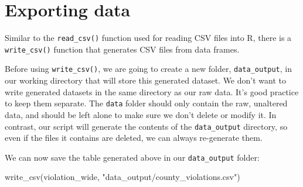 \documentclass[
]{book}
\newenvironment{Shaded}{\begin{snugshade}}{\end{snugshade}}
\newcommand{\FunctionTok}[1]{\textcolor[rgb]{0.00,0.00,0.00}{#1}}
\newcommand{\NormalTok}[1]{#1}
\newcommand{\StringTok}[1]{\textcolor[rgb]{0.31,0.60,0.02}{#1}}
\begin{document}
\hypertarget{exporting-data}{%
\section{Exporting data}\label{exporting-data}}

Similar to the \texttt{read\_csv()} function used for reading CSV files into R, there is a \texttt{write\_csv()} function that generates CSV files from data frames.

Before using \texttt{write\_csv()}, we are going to create a new folder, \texttt{data\_output},
in our working directory that will store this generated dataset. We don't want
to write generated datasets in the same directory as our raw data. It's good
practice to keep them separate. The \texttt{data} folder should only contain the raw,
unaltered data, and should be left alone to make sure we don't delete or modify
it. In contrast, our script will generate the contents of the \texttt{data\_output}
directory, so even if the files it contains are deleted, we can always
re-generate them.

We can now save the table generated above in our \texttt{data\_output}
folder:

\begin{Shaded}
\begin{Highlighting}[]
\FunctionTok{write\_csv}\NormalTok{(violation\_wide, }\StringTok{"data\_output/county\_violations.csv"}\NormalTok{)}
\end{Highlighting}
\end{Shaded}


  
\end{document}
